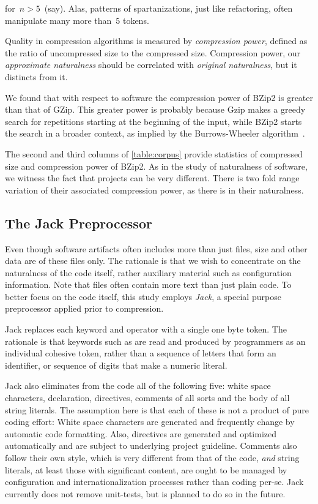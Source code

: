 for~$n>5$~(say). Alas, patterns of spartanizations, just like refactoring,
often manipulate many more than~$5$ tokens.

Quality in compression algorithms is measured by \emph{compression power},
defined as the ratio of uncompressed size to the compressed size. Compression
power, our \emph{approximate naturalness} should be correlated with
\emph{original naturalness}, but it distincts from it.

We found that with respect to \Java software the compression power of
BZip2 is greater than that of GZip. This greater power
is probably because Gzip makes a greedy search for repetitions starting at the
beginning of the input, while BZip2 starts the search in a broader context, as
implied by the Burrows-Wheeler algorithm~\cite{Burrows:Wheeler:94}.

The second and third columns of \cref{table:corpus} provide statistics of
compressed size and compression power of BZip2. As in
the study of naturalness of software, we witness the fact that projects can be
very different. There is two fold range variation of their associated
compression power, as there is in their naturalness.

\subsection{The Jack Preprocessor}

Even though software artifacts often includes more than just  files,
size and other data are of these files only. The rationale is that we wish to
concentrate on the naturalness of the \Java code itself, rather auxiliary
material such as configuration information.
Note that  files often contain more text than just plain code. To
better focus on the code itself, this study employs \emph{Jack}, a special
purpose \Java preprocessor applied prior to compression.

Jack replaces each keyword and operator with a single one byte token. The
rationale is that keywords such as  are read and produced by
programmers as an individual cohesive token, rather than a sequence of letters
that form an identifier, or sequence of digits that make a numeric literal.

Jack also eliminates from the \Java code all of the following five: white space
characters,  declaration,  directives, comments of all
sorts and the body of all string literals. The assumption here is that each
of these is not a product of pure coding effort: White space characters are
generated and frequently change by automatic code formatting. Also, 
directives are generated and optimized automatically and are subject to
underlying project guideline. Comments also follow their own style, which is
very different from that of the code, \emph{and} string literals, at least
those with significant content, are ought to be managed by configuration and
internationalization processes rather than coding per-se.
Jack currently does not remove unit-tests, but is planned to do so in the
future.

